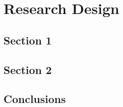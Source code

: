 \chapter{Research Design} \label{chap:research_design}

\section{Section 1}

\section{Section 2}

\section{Conclusions}